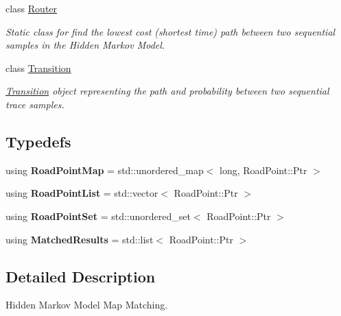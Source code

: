 \begin{DoxyCompactItemize}
class \hyperlink{classhmm__mm_1_1Router}{Router}
\begin{DoxyCompactList}\small\item\em Static class for find the lowest cost (shortest time) path between two sequential samples in the Hidden Markov Model. \end{DoxyCompactList}\item 
class \hyperlink{classhmm__mm_1_1Transition}{Transition}
\begin{DoxyCompactList}\small\item\em \hyperlink{classhmm__mm_1_1Transition}{Transition} object representing the path and probability between two sequential trace samples. \end{DoxyCompactList}\end{DoxyCompactItemize}
\subsection*{Typedefs}
\begin{DoxyCompactItemize}
\item 
using {\bfseries Road\+Point\+Map} = std\+::unordered\+\_\+map$<$ long, Road\+Point\+::\+Ptr $>$\hypertarget{namespacehmm__mm_a2082386e29c66edb1a4ea35eab592d1f}{}\label{namespacehmm__mm_a2082386e29c66edb1a4ea35eab592d1f}

\item 
using {\bfseries Road\+Point\+List} = std\+::vector$<$ Road\+Point\+::\+Ptr $>$\hypertarget{namespacehmm__mm_a95b877e1f599aba61a3f79a8ab7e5f29}{}\label{namespacehmm__mm_a95b877e1f599aba61a3f79a8ab7e5f29}

\item 
using {\bfseries Road\+Point\+Set} = std\+::unordered\+\_\+set$<$ Road\+Point\+::\+Ptr $>$\hypertarget{namespacehmm__mm_abf21c09a2f7e31b37b496631e727f51a}{}\label{namespacehmm__mm_abf21c09a2f7e31b37b496631e727f51a}

\item 
using {\bfseries Matched\+Results} = std\+::list$<$ Road\+Point\+::\+Ptr $>$\hypertarget{namespacehmm__mm_a0bf17e25adf5c987f838b20572785ef7}{}\label{namespacehmm__mm_a0bf17e25adf5c987f838b20572785ef7}

\end{DoxyCompactItemize}


\subsection{Detailed Description}
Hidden Markov Model Map Matching. 